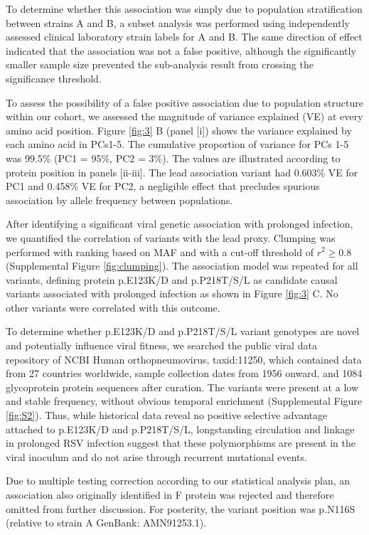 \documentclass{article} %
\begin{document}
To determine whether this association was simply due to population stratification between strains A and B, a subset analysis was performed using independently assessed clinical laboratory strain labels for A and B. 
The same direction of effect indicated that the association was not a false positive, although the significantly smaller sample size prevented the sub-analysis result from crossing the significance threshold.

To assess the possibility of a false positive association due to population structure within our cohort, we assessed the magnitude of variance explained (VE) at every amino acid position. Figure \ref{fig:3} B (panel [i]) shows the variance explained by each amino acid in PCs1-5. 
The cumulative proportion of variance for PCs 1-5 was 99.5\% (PC1 = 95\%, PC2 = 3\%). The values are illustrated according to protein position in panels [ii-iii]. 
The lead association variant had 0.603\% VE for PC1 and 0.458\% VE for PC2, a negligible effect that precludes spurious association by allele frequency between populations.

After identifying a significant viral genetic association with prolonged infection, we quantified the correlation of variants with the lead proxy. 
Clumping was performed with ranking based on MAF and with a cut-off threshold of $r^2 \ge 0.8$ (Supplemental Figure \ref{fig:clumping}). 
The association model was repeated for all variants, defining protein p.E123K/D and p.P218T/S/L as candidate causal variants associated with prolonged infection as shown in Figure \ref{fig:3} C. 
No other variants were correlated with this outcome.

To determine whether p.E123K/D and p.P218T/S/L variant genotypes are novel and potentially influence viral fitness, we searched the public viral data repository of NCBI Human orthopneumovirus, taxid:11250, which contained data from 27 countries worldwide, sample collection dates from 1956 onward, and 1084 glycoprotein protein sequences after curation. 
The variants were present at a low and stable frequency, without obvious temporal enrichment (Supplemental Figure \ref{fig:S2}). 
Thus, while historical data reveal no positive selective advantage attached to p.E123K/D and p.P218T/S/L, longstanding circulation and linkage in prolonged RSV infection suggest that these polymorphisms are present in the viral inoculum and do not arise through recurrent mutational events.

Due to multiple testing correction according to our statistical analysis plan, an association also originally identified in F protein was rejected and therefore omitted from further discussion. 
For posterity, the variant position was p.N116S (relative to strain A GenBank: AMN91253.1).
\end{document}

